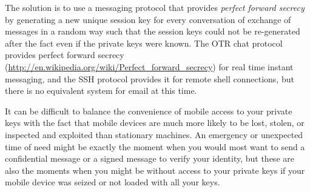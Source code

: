 The solution is to use a messaging protocol that provides \emph{perfect
forward secrecy} by generating a new unique session key for every
conversation of exchange of messages in a random way such that the
session keys could not be re-generated after the fact even if the
private keys were known. The OTR chat protocol provides perfect forward
secrecy
(\href{http://en.wikipedia.org/wiki/Perfect\_forward\_secrecy}{http://en.wikipedia.org/wiki/Perfect\_forward\_secrecy})
for real time instant messaging, and the SSH protocol provides it for
remote shell connections, but there is no equivalent system for email at
this time.

It can be difficult to balance the convenience of mobile access to your
private keys with the fact that mobile devices are much more likely to
be lost, stolen, or inspected and exploited than stationary machines. An
emergency or unexpected time of need might be exactly the moment when
you would most want to send a confidential message or a signed message
to verify your identity, but these are also the moments when you might
be without access to your private keys if your mobile device was seized
or not loaded with all your keys.
